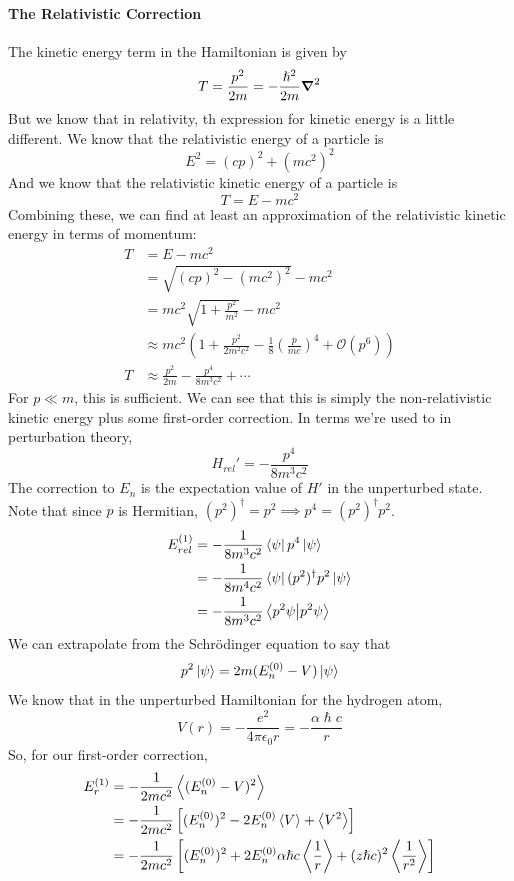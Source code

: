 \documentclass[a4paper]{article}
\begin{document}
\paragraph{The Relativistic Correction}
	The kinetic energy
	term in the Hamiltonian is given by
	\[ T = \frac{p^2}{2m} = -\frac{\hslash^2}{2m}\boldsymbol{\mathbf{\nabla}}^2 \]
	But we know that in relativity, th expression for kinetic energy is a
	little different. We know that the relativistic energy of a particle is
	\[ E^2 = (cp)^2 + (mc^2)^2\]
	And we know that the relativistic kinetic energy of a particle is
	\[ T = E - mc^2 \]
	Combining these, we can find at least an approximation of the
	relativistic kinetic energy in terms of momentum:
	\begin{align*}
		T &= E - mc^2\\
		  &= \sqrt{(cp)^2-(mc^2)^2} - mc^2\\
		  &= mc^2\sqrt{1+\frac{p^2}{m^2}} - mc^2\\
		  &\approx mc^2\left(1+\frac{p^2}{2m^2c^2} -
			\frac{1}{8}\left(\frac{p}{mc}\right)^4 +
			\mathcal{O}(p^6)\right)\\
		T &\approx \frac{p^2}{2m} - \frac{p^4}{8m^3c^2} + \cdots
	\end{align*}
	For $p\ll m$, this is sufficient. We can see that this is simply the
	non-relativistic kinetic energy plus some first-order correction. In
	terms we're used to in perturbation theory,
	\[ H_{rel}' = -\frac{p^4}{8m^3c^2} \]
	The correction to $E_n$ is the expectation value of $H'$ in the
	unperturbed state. Note that since $p$ is Hermitian,
	$(p^2)^\dagger = p^2 \implies p^4 = (p^2)^\dagger p^2$.
	\begin{align*}
		E_{rel}^{(1)} &= -\frac{1}{8m^3c^2}\left\langle \psi \right\rvert p^4\left\lvert \psi\right\rangle\\
			      &= -\frac{1}{8m^4c^2}
				\left\langle \psi \right\rvert(p^2)^\dagger p^2\left\lvert \psi\right\rangle\\
			      &= -\frac{1}{8m^3c^2}\left\langle p^2\psi\middle\vert p^2\psi \right\rangle
	\end{align*}
	We can extrapolate from the Schr\"odinger equation to say that
	\[ p^2\left\lvert \psi\right\rangle = 2m(E_n^{(0)} - V)\left\lvert \psi\right\rangle \]
	We know that in the unperturbed Hamiltonian for the hydrogen atom,
	\[ V(r) = -\frac{e^2}{4\pi\epsilon_0 r} = -\frac{\alpha\hslash c}{r} \]
	So, for our first-order correction,
	\begin{align*}
		E_r^{(1)} &= -\frac{1}{2mc^2}\left\langle (E_n^{(0)}-V)^2\right\rangle\\
			  &= -\frac{1}{2mc^2}
		\left[(E_n^{(0)})^2-2E_n^{(0)}\left\langle V\right\rangle+\left\langle V^2\right\rangle\right]\\
			&= -\frac{1}{2mc^2}\left[
		(E_n^{(0)})^2 + 2E_n^{(0)}\alpha\hslash c\left\langle \frac{1}{r}\right\rangle +
		(z\hslash c)^2\left\langle \frac{1}{r^2}\right\rangle\right]
	\end{align*}
\end{document}
